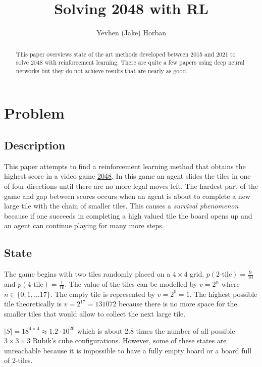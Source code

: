 \documentclass[letterpaper]{article} %
\title{Solving 2048 with RL}
\author{
    Yevhen (Jake) Horban
}
\begin{document}
\maketitle
\begin{abstract}
This paper overviews state of the art methods developed between 2015 and 2021 to solve 2048 with reinforcement learning. There are quite a few papers using deep neural networks but they do not achieve results that are nearly as good. 
\end{abstract}

\section{Problem}

\subsection{Description}

This paper attempts to find a reinforcement learning method that obtains the highest score in a video game \href{https://github.com/gabrielecirulli/2048}{2048}. In this game an agent slides the tiles in one of four directions until there are no more legal moves left. The hardest part of the game and gap between scores occurs when an agent is about to complete a new large tile with the chain of smaller tiles. This causes a \textit{survival phenomenon} because if one succeeds in completing a high valued tile the board opens up and an agent can continue playing for many more steps.

\subsection{State}

The game begins with two tiles randomly placed on a $4 \times 4$ grid. $p(2\text{-tile}) = \frac{9}{10}$ and $p(4\text{-tile}) = \frac{1}{10}$. The value of the tiles can be modelled by $v = 2^n$ where $n \in \{0, 1, \dots 17\}$. The empty tile is represented by $v=2^0 = 1$. The highest possible tile theoretically is $v=2^{17} = 131072$ because there is no more space for the smaller tiles that would allow to collect the next large tile.

$|S| = 18^{4 \times 4} \approx 1.2 \cdot 10^{20}$ which is about 2.8 times the number of all possible $3 \times 3 \times 3$ Rubik's cube configurations. However, some of these states are unreachable because it is impossible to have a fully empty board or a board full of 2-tiles. 
\end{document}
